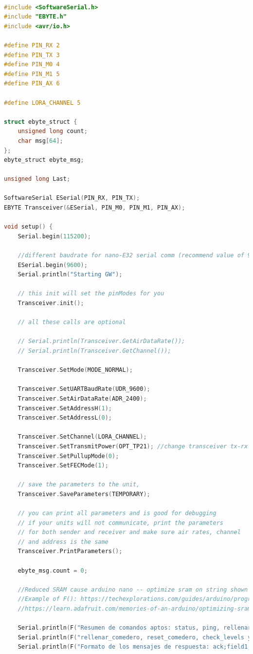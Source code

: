 \documentclass[12pt]{article}
\begin{document}
	\begin{lstlisting}[language=C]

#include <SoftwareSerial.h>
#include "EBYTE.h"
#include <avr/io.h>

#define PIN_RX 2
#define PIN_TX 3
#define PIN_M0 4
#define PIN_M1 5
#define PIN_AX 6

#define LORA_CHANNEL 5

struct ebyte_struct {
	unsigned long count;
	char msg[64];                                           
};
ebyte_struct ebyte_msg;

unsigned long Last;

SoftwareSerial ESerial(PIN_RX, PIN_TX);
EBYTE Transceiver(&ESerial, PIN_M0, PIN_M1, PIN_AX);

void setup() {
	Serial.begin(115200); 
	
	//different baudrate for nano-E32 serial comm (recommend value of 9600)
	ESerial.begin(9600);
	Serial.println("Starting GW");
	
	// this init will set the pinModes for you
	Transceiver.init();
	
	// all these calls are optional
	
	// Serial.println(Transceiver.GetAirDataRate());
	// Serial.println(Transceiver.GetChannel());
	
	Transceiver.SetMode(MODE_NORMAL);
	
	Transceiver.SetUARTBaudRate(UDR_9600);
	Transceiver.SetAirDataRate(ADR_2400);
	Transceiver.SetAddressH(1);
	Transceiver.SetAddressL(0);
	
	Transceiver.SetChannel(LORA_CHANNEL);
	Transceiver.SetTransmitPower(OPT_TP21); //change transceiver tx-rx power
	Transceiver.SetPullupMode(0);
	Transceiver.SetFECMode(1);
	
	// save the parameters to the unit,
	Transceiver.SaveParameters(TEMPORARY);
	
	// you can print all parameters and is good for debugging
	// if your units will not communicate, print the parameters
	// for both sender and receiver and make sure air rates, channel
	// and address is the same
	Transceiver.PrintParameters();
	
	ebyte_msg.count = 0;
	
	//Reduced SRAM cause arduino nano -- optimize sram on string shown on Serial.println using "F" function 
	//Example of F(): https://techexplorations.com/guides/arduino/programming/f-macro/
	//https://learn.adafruit.com/memories-of-an-arduino/optimizing-sram
	
	Serial.println(F("Resumen de comandos aptos: status, ping, rellenar_bebedero,"));
	Serial.println(F("rellenar_comedero, reset_comedero, check_levels y update_oled"));
	Serial.println(F("Formato de los mensajes de respuesta: ack;field1;var1"));
	

\end{lstlisting}
\end{document}
